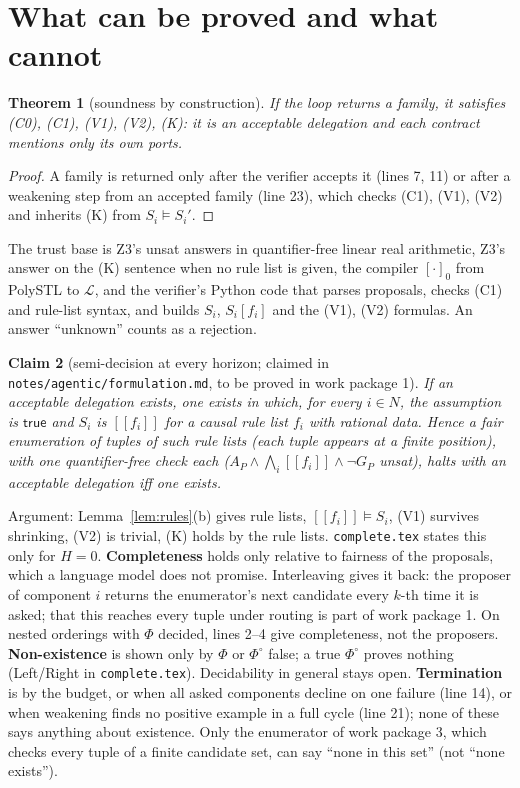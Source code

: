 \documentclass[10pt]{article}
\theoremstyle{tplain}\newtheorem{theorem}{Theorem}\newtheorem{lemma}[theorem]{Lemma}\newtheorem{proposition}[theorem]{Proposition}\newtheorem{corollary}[theorem]{Corollary}\newtheorem{claim}[theorem]{Claim}
\theoremstyle{tdef}\newtheorem{definition}[theorem]{Definition}
\newcommand{\TRUE}{\mathsf{true}}\newcommand{\FALSE}{\mathsf{false}}
\newcommand{\df}[1]{[\![#1]\!]}\newcommand{\hid}[1]{\overline{#1}}
\begin{document}
\section{What can be proved and what cannot}
\begin{theorem}[soundness by construction]
If the loop returns a family, it satisfies (C0), (C1), (V1), (V2), (K): it is an acceptable delegation and each contract mentions only its own ports.
\end{theorem}
\begin{proof}
A family is returned only after the verifier accepts it (lines 7, 11) or after a weakening step from an accepted family (line 23), which checks (C1), (V1), (V2) and inherits (K) from $S_i\models S_i'$.
\end{proof}
The trust base is Z3's unsat answers in quantifier-free linear real arithmetic, Z3's answer on the (K) sentence when no rule list is given, the compiler $[\cdot]_0$ from PolySTL to $\mathcal L$, and the verifier's Python code that parses proposals, checks (C1) and rule-list syntax, and builds $S_i$, $S_i[f_i]$ and the (V1), (V2) formulas. An answer ``unknown'' counts as a rejection.

\begin{claim}[semi-decision at every horizon; claimed in \texttt{notes/agentic/formulation.md}, to be proved in work package 1]
If an acceptable delegation exists, one exists in which, for every $i\in N$, the assumption is $\TRUE$ and $S_i$ is $\df{f_i}$ for a causal rule list $f_i$ with rational data. Hence a fair enumeration of tuples of such rule lists (each tuple appears at a finite position), with one quantifier-free check each ($A_P\wedge\bigwedge_i\df{f_i}\wedge\neg G_P$ unsat), halts with an acceptable delegation iff one exists.
\end{claim}
Argument: Lemma~\ref{lem:rules}(b) gives rule lists, $\df{f_i}\models S_i$, (V1) survives shrinking, (V2) is trivial, (K) holds by the rule lists. \texttt{complete.tex} states this only for $H=0$. \textbf{Completeness} holds only relative to fairness of the proposals, which a language model does not promise. Interleaving gives it back: the proposer of component $i$ returns the enumerator's next candidate every $k$-th time it is asked; that this reaches every tuple under routing is part of work package 1. On nested orderings with $\Phi$ decided, lines 2--4 give completeness, not the proposers. \textbf{Non-existence} is shown only by $\Phi$ or $\Phi^\circ$ false; a true $\Phi^\circ$ proves nothing (Left/Right in \texttt{complete.tex}). Decidability in general stays open. \textbf{Termination} is by the budget, or when all asked components decline on one failure (line 14), or when weakening finds no positive example in a full cycle (line 21); none of these says anything about existence. Only the enumerator of work package 3, which checks every tuple of a finite candidate set, can say ``none in this set'' (not ``none exists'').
\end{document}

